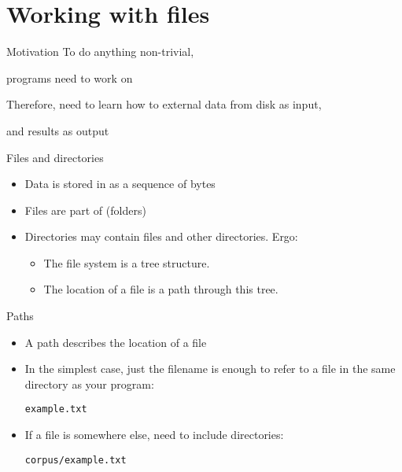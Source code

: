 \documentclass[aspectratio=169,usenames,dvipsnames]{beamer}
\begin{document}


\section{Working with files}
\frame{\tableofcontents[currentsection]}

\begin{frame}{Motivation}
    To do anything non-trivial,

    programs need to work on 

    \pause
    Therefore, need to learn how to  external data from disk as input,

    and  results as output

\end{frame}


\begin{frame}{Files and directories}
    \begin{itemize}
        \item Data is stored in  as a sequence of bytes
        \item Files are part of  (folders)
        \item Directories may contain files and other directories. Ergo:
            \begin{itemize}
                \item The file system is a tree structure.
                \item The location of a file is a path through this tree.
            \end{itemize}
    \end{itemize}
\end{frame}

\begin{frame}{Paths}
    \begin{itemize}
        \item A path describes the location of a file
        \item In the simplest case, just the filename is enough to
            refer to a file in the same directory as your program:

            \texttt{example.txt}
        \item If a file is somewhere else, need to include directories:

            \texttt{corpus/example.txt}
    \end{itemize}
\end{frame}
\end{document}

